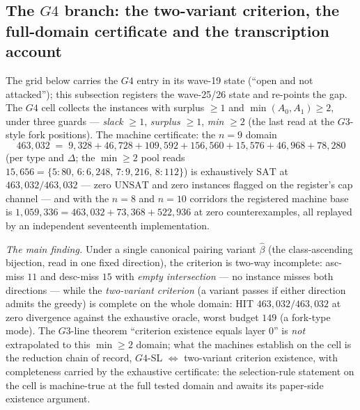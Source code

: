 \subsection{The $G4$ branch: the two-variant criterion, the full-domain
certificate and the transcription account}\label{subsec:g4line}

The grid below carries the $G4$ entry in its wave-19 state (``open and not
attacked''); this subsection registers the wave-25/26 state and re-points the gap.
The $G4$ cell collects the instances with surplus $\ge1$ and $\min(A_0,A_1)\ge2$,
under three guards --- \emph{slack} $\ge1$, \emph{surplus} $\ge1$, \emph{min} $\ge2$
(the last read at the $G3$-style fork positions). The machine certificate: the $n=9$
domain
\[
463{,}032 \;=\; 9{,}328+46{,}728+109{,}592+156{,}560+15{,}576+46{,}968+78{,}280
\]
(per type and $\Delta$; the $\min\ge2$ pool reads
$15{,}656=\{5{:}80,\,6{:}6{,}248,\,7{:}9{,}216,\,8{:}112\}$) is exhaustively
$\mathrm{SAT}$ at $463{,}032/463{,}032$ --- zero $\mathrm{UNSAT}$ and zero instances
flagged on the register's cap channel --- and with the $n=8$ and $n=10$ corridors the
registered machine base is $1{,}059{,}336=463{,}032+73{,}368+522{,}936$ at zero
counterexamples, all replayed by an independent seventeenth implementation.

\emph{The main finding.} Under a single canonical pairing variant $\hat\beta$ (the
class-ascending bijection, read in one fixed direction), the criterion is two-way
incomplete: asc-miss $11$ and desc-miss $15$ with \emph{empty intersection} --- no
instance misses both directions --- while the \emph{two-variant criterion} (a
variant passes if either direction admits the greedy) is complete on the whole
domain: HIT $463{,}032/463{,}032$ at zero divergence against the exhaustive oracle,
worst budget $149$ (a fork-type mode). The $G3$-line theorem ``criterion existence
equals layer $0$'' is \emph{not} extrapolated to this $\min\ge2$ domain; what the
machines establish on the cell is the reduction chain of record, $G4$-SL $\iff$
two-variant criterion existence, with completeness carried by the exhaustive
certificate: the selection-rule statement on the cell is machine-true at the full
tested domain and awaits its paper-side existence argument.

